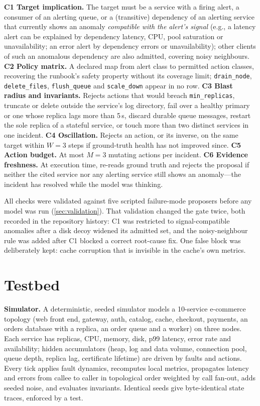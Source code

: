 \documentclass[conference]{IEEEtran}
\begin{document}
\textbf{C1 Target implication.} The target must be a service with a firing alert, a
consumer of an alerting queue, or a (transitive) dependency of an alerting service
that currently shows an anomaly \emph{compatible with the alert's signal} (e.g., a
latency alert can be explained by dependency latency, CPU, pool saturation or
unavailability; an error alert by dependency errors or unavailability); other clients
of such an anomalous dependency are also admitted, covering noisy neighbours.
\textbf{C2 Policy matrix.} A declared map from alert class to permitted action
classes, recovering the runbook's safety property without its coverage limit;
\texttt{drain\_node}, \texttt{delete\_files}, \texttt{flush\_queue} and
\texttt{scale\_down} appear in no row.
\textbf{C3 Blast radius and invariants.} Rejects actions that would breach
\texttt{min\_replicas}, truncate or delete outside the service's log directory, fail
over a healthy primary or one whose replica lags more than 5\,s, discard durable
queue messages, restart the sole replica of a stateful service, or touch more than two
distinct services in one incident.
\textbf{C4 Oscillation.} Rejects an action, or its inverse, on the same target within
$W{=}3$ steps if ground-truth health has not improved since.
\textbf{C5 Action budget.} At most $M{=}3$ mutating actions per incident.
\textbf{C6 Evidence freshness.} At execution time, re-reads ground truth and rejects
the proposal if neither the cited service nor any alerting service still shows an
anomaly---the incident has resolved while the model was thinking.

All checks were validated against five scripted failure-mode proposers before any
model was run (\cref{sec:validation}). That validation changed the gate twice, both
recorded in the repository history: C1 was restricted to signal-compatible
anomalies after a disk decoy widened its admitted set, and the noisy-neighbour rule was
added after C1 blocked a correct root-cause fix. One false block was deliberately
kept: cache corruption that is invisible in the cache's own metrics.

\section{Testbed}
\label{sec:testbed}

\textbf{Simulator.} A deterministic, seeded simulator models a 10-service e-commerce
topology (web front end, gateway, auth, catalog, cache, checkout, payments, an orders
database with a replica, an order queue and a worker) on three nodes. Each service has
replicas, CPU, memory, disk, p99 latency, error rate and availability; hidden
accumulators (heap, log and data volume, connection pool, queue depth, replica lag,
certificate lifetime) are driven by faults and actions. Every tick applies fault
dynamics, recomputes local metrics, propagates latency and errors from callee to caller
in topological order weighted by call fan-out, adds seeded noise, and evaluates
invariants. Identical seeds give byte-identical state traces, enforced by a test.
\end{document}
